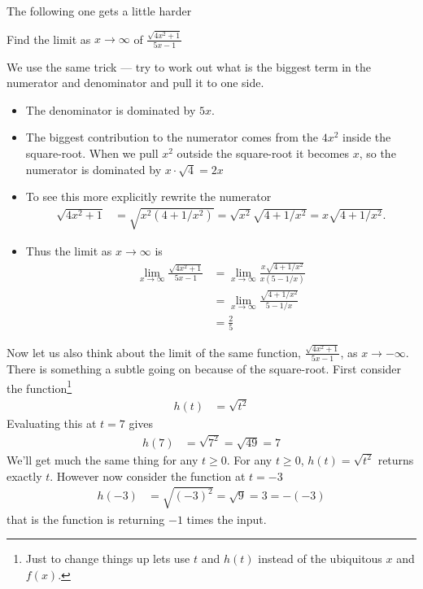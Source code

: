 The following one gets a little harder
\begin{eg}\label{eg lim tricky}
 Find the limit as $x \to \infty$ of $\frac{\sqrt{4x^2+1}}{5x-1}$

We use the same trick --- try to work out what is the biggest term in the
numerator and denominator and pull it to one side.
\begin{itemize}
 \item The denominator is dominated by $5x$.
 \item The biggest contribution to the numerator comes from the $4x^2$ inside
the square-root. When we pull $x^2$ outside the square-root it becomes $x$,
so the numerator is dominated by $x \cdot \sqrt{4} = 2x$
 \item To see this more explicitly rewrite the numerator
\begin{align*}
  \sqrt{4x^2+1} &= \sqrt{x^2 (4+1/x^2)} = \sqrt{x^2} \sqrt{4+1/x^2} =
x\sqrt{4+1/x^2}.
\end{align*}
\item Thus the limit as $x \to \infty$ is
\begin{align*}
 \lim_{x \to \infty} \frac{\sqrt{4x^2+1}}{5x-1}
 &= \lim_{x \to \infty} \frac{x \sqrt{4+1/x^2}}{x(5-1/x)}\\
 &= \lim_{x \to \infty} \frac{\sqrt{4+1/x^2}}{5-1/x} \\
 & = \frac{2}{5}
\end{align*}
\end{itemize}
\end{eg}

Now let us also think about the limit of the same function,
$\frac{\sqrt{4x^2+1}}{5x-1}$, as $x \rightarrow -\infty$. There is something a
subtle going on because of the square-root. First consider the
function\footnote{Just to change things up lets use $t$ and $h(t)$ instead of
the ubiquitous $x$ and $f(x)$.}
\begin{align*}
  h(t) &= \sqrt{t^2}
\end{align*}
Evaluating this at $t=7$ gives
\begin{align*}
  h(7) &= \sqrt{ 7^2 } = \sqrt{49} = 7
\end{align*}
We'll get much the same thing for any $t \geq 0$. For any $t \ge 0$, $h(t)=\sqrt{t^2}$
returns exactly $t$. However now consider the function at $t=-3$
\begin{align*}
  h(-3) &= \sqrt{ (-3)^2 } = \sqrt{9} = 3 = - (-3)
\end{align*}
that is the function is returning $-1$ times the input.

